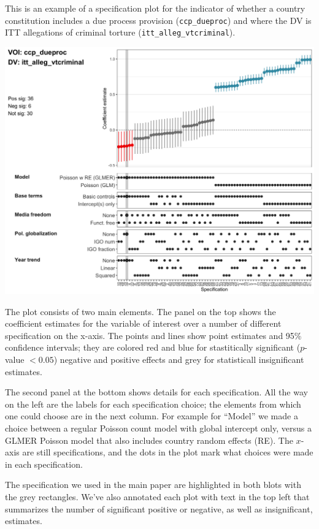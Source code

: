 \documentclass[]{article}
\begin{document}
This is an example of a specification plot for the indicator of whether
a country constitution includes a due process provision
(\texttt{ccp\_dueproc}) and where the DV is ITT allegations of criminal
torture (\texttt{itt\_alleg\_vtcriminal}).

\includegraphics{../output/figures-robustness/specplot-ccp_dueproc-itt_alleg_vtcriminal.png}

The plot consists of two main elements. The panel on the top shows the
coefficient estimates for the variable of interest over a number of
different specification on the x-axis. The points and lines show point
estimates and 95\% confidence intervals; they are colored red and blue
for stastitically significant (\(p\)-value \(< 0.05\)) negative and
positive effects and grey for statisticall insignificant estimates.

The second panel at the bottom shows details for each specification. All
the way on the left are the labels for each specification choice; the
elements from which one could choose are in the next column. For example
for ``Model'' we made a choice between a regular Poisson count model
with global intercept only, versus a GLMER Poisson model that also
includes country random effects (RE). The \(x\)-axis are still
specifications, and the dots in the plot mark what choices were made in
each specification.

The specification we used in the main paper are highlighted in both
blots with the grey rectangles. We've also annotated each plot with text
in the top left that summarizes the number of significant positive or
negative, as well as insignificant, estimates.
\end{document}

